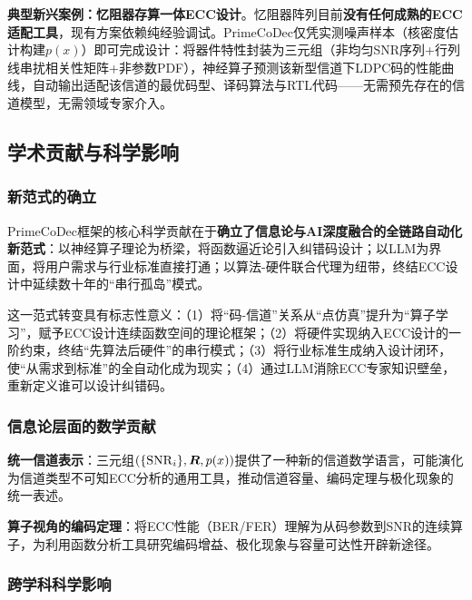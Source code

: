 \textbf{典型新兴案例：忆阻器存算一体ECC设计}。忆阻器阵列目前\textbf{没有任何成熟的ECC适配工具}，现有方案依赖纯经验调试。PrimeCoDec仅凭实测噪声样本（核密度估计构建$p(x)$）即可完成设计：将器件特性封装为三元组（非均匀SNR序列+行列线串扰相关性矩阵+非参数PDF），神经算子预测该新型信道下LDPC码的性能曲线，自动输出适配该信道的最优码型、译码算法与RTL代码——无需预先存在的信道模型，无需领域专家介入。

\subsection{学术贡献与科学影响}\label{sec:impact}

\subsubsection{新范式的确立}

PrimeCoDec框架的核心科学贡献在于\textbf{确立了信息论与AI深度融合的全链路自动化新范式}：以神经算子理论为桥梁，将函数逼近论引入纠错码设计；以LLM为界面，将用户需求与行业标准直接打通；以算法-硬件联合代理为纽带，终结ECC设计中延续数十年的``串行孤岛''模式。

这一范式转变具有标志性意义：（1）将``码-信道''关系从``点仿真''提升为``算子学习''，赋予ECC设计连续函数空间的理论框架；（2）将硬件实现纳入ECC设计的一阶约束，终结``先算法后硬件''的串行模式；（3）将行业标准生成纳入设计闭环，使``从需求到标准''的全自动化成为现实；（4）通过LLM消除ECC专家知识壁垒，重新定义谁可以设计纠错码。

\subsubsection{信息论层面的数学贡献}

\textbf{统一信道表示}：三元组$(\{\mathrm{SNR}_i\},\bm{R},p(x))$提供了一种新的信道数学语言，可能演化为信道类型不可知ECC分析的通用工具，推动信道容量、编码定理与极化现象的统一表述。

\textbf{算子视角的编码定理}：将ECC性能（BER/FER）理解为从码参数到SNR的连续算子，为利用函数分析工具研究编码增益、极化现象与容量可达性开辟新途径。

\subsubsection{跨学科科学影响}


